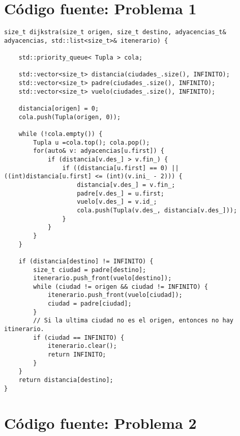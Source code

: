 \appendix



\section{Código fuente: Problema 1} \label{App:AppendixA}

\begin{frame}

\begin{lstlisting}
size_t dijkstra(size_t origen, size_t destino, adyacencias_t& adyacencias, std::list<size_t>& itenerario) {

    std::priority_queue< Tupla > cola;

    std::vector<size_t> distancia(ciudades_.size(), INFINITO);
    std::vector<size_t> padre(ciudades_.size(), INFINITO);
    std::vector<size_t> vuelo(ciudades_.size(), INFINITO);

    distancia[origen] = 0;
    cola.push(Tupla(origen, 0));

    while (!cola.empty()) {
        Tupla u =cola.top(); cola.pop();
        for(auto& v: adyacencias[u.first]) {
            if (distancia[v.des_] > v.fin_) {
                if ((distancia[u.first] == 0) || ((int)distancia[u.first] <= (int)(v.ini_ - 2))) {
                    distancia[v.des_] = v.fin_;
                    padre[v.des_] = u.first;
                    vuelo[v.des_] = v.id_;
                    cola.push(Tupla(v.des_, distancia[v.des_]));
                }
            }
        }
    }

    if (distancia[destino] != INFINITO) {
        size_t ciudad = padre[destino];
        itenerario.push_front(vuelo[destino]);
        while (ciudad != origen && ciudad != INFINITO) {
            itenerario.push_front(vuelo[ciudad]);
            ciudad = padre[ciudad];
        }
        // Si la ultima ciudad no es el origen, entonces no hay itinerario.
        if (ciudad == INFINITO) {
            itenerario.clear();
            return INFINITO;
        }
    }
    return distancia[destino];
}

\end{lstlisting}
\end{frame}

\newpage
\section{Código fuente: Problema 2} \label{App:AppendixB}

